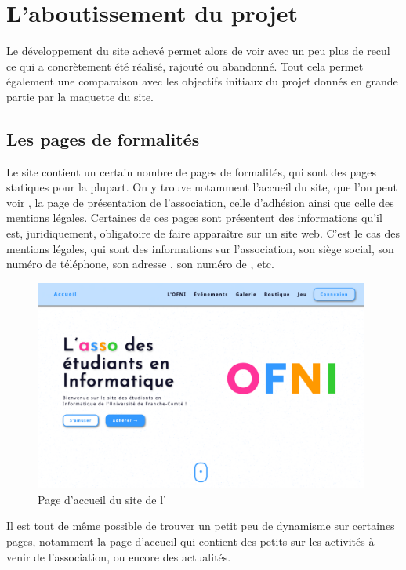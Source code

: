 \chapter{L'aboutissement du projet}
\label{chap:aboutissement}

Le développement du site achevé permet alors de voir avec un peu plus de recul ce qui a concrètement été réalisé, rajouté ou abandonné. Tout cela permet également une comparaison avec les objectifs initiaux du projet donnés en grande partie par la maquette du site.

\section{Les pages de formalités}
\label{sec:pages-formalites}

Le site contient un certain nombre de pages de formalités, qui sont des pages statiques pour la plupart. On y trouve notamment l'accueil du site, que l'on peut voir , la page de présentation de l'association, celle d'adhésion ainsi que celle des mentions légales. Certaines de ces pages sont présentent des informations qu'il est, juridiquement, obligatoire de faire apparaître sur un site web. C'est le cas des mentions légales, qui sont des informations sur l'association, son siège social, son numéro de téléphone, son adresse , son numéro de , etc.
\bigskip

\begin{figure}[h]
    \centering
    \includegraphics[width=11cm]{assets/pictures/home-page.png}
    \caption{Page d'accueil du site de l'\ofni}
    \label{fig:home-page}
\end{figure}
\bigskip

Il est tout de même possible de trouver un petit peu de dynamisme sur certaines pages, notamment la page d'accueil qui contient des petits  sur les activités à venir de l'association, ou encore des actualités.

